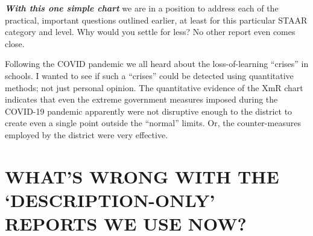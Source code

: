 \documentclass[
  letterpaper,
  DIV=11,
  numbers=noendperiod]{scrartcl}
\begin{document}
\begin{tcolorbox}[enhanced jigsaw, leftrule=.75mm, breakable, opacityback=0, toptitle=1mm, coltitle=black, opacitybacktitle=0.6, bottomrule=.15mm, colbacktitle=quarto-callout-important-color!10!white, colframe=quarto-callout-important-color-frame, arc=.35mm, bottomtitle=1mm, titlerule=0mm, title=\textcolor{quarto-callout-important-color}{\faExclamation}\hspace{0.5em}{Important}, colback=white, rightrule=.15mm, left=2mm, toprule=.15mm]

{\textbf{\emph{With this one simple chart}} we are in a position to
address each of the practical, important questions outlined earlier, at
least for this particular STAAR category and level. Why would you settle
for less? No other report even comes close.}

\end{tcolorbox}

\begin{tcolorbox}[enhanced jigsaw, leftrule=.75mm, breakable, opacityback=0, toptitle=1mm, coltitle=black, opacitybacktitle=0.6, bottomrule=.15mm, colbacktitle=quarto-callout-tip-color!10!white, colframe=quarto-callout-tip-color-frame, arc=.35mm, bottomtitle=1mm, titlerule=0mm, title=\textcolor{quarto-callout-tip-color}{\faLightbulb}\hspace{0.5em}{Interesting Observation:}, colback=white, rightrule=.15mm, left=2mm, toprule=.15mm]

{Following the COVID pandemic we all heard about the loss-of-learning
``crises'' in schools. I wanted to see if such a ``crises'' could be
detected using quantitative methods; not just personal opinion. The
quantitative evidence of the XmR chart indicates that even the extreme
government measures imposed during the COVID-19 pandemic apparently were
not disruptive enough to the district to create even a single point
outside the ``normal'' limits. Or, the counter-measures employed by the
district were very effective.}

\end{tcolorbox}

\vspace{0.3in}

\section{\texorpdfstring{\textbf{WHAT'S WRONG WITH THE
`DESCRIPTION-ONLY' REPORTS WE USE
NOW?}}{WHAT'S WRONG WITH THE `DESCRIPTION-ONLY' REPORTS WE USE NOW?}}\label{whats-wrong-with-the-description-only-reports-we-use-now}
\end{document}
